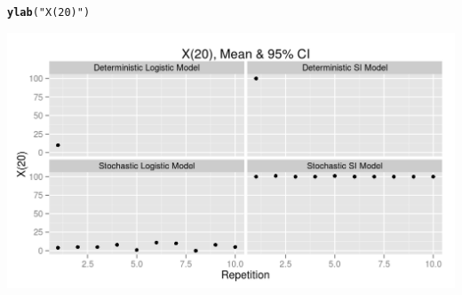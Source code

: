 \documentclass{article}\usepackage[]{graphicx}\usepackage[]{color}
\makeatletter
\newcommand{\hlstr}[1]{\textcolor[rgb]{0.192,0.494,0.8}{#1}}%
\newcommand{\hlstd}[1]{\textcolor[rgb]{0.345,0.345,0.345}{#1}}%
\newcommand{\hlkwd}[1]{\textcolor[rgb]{0.737,0.353,0.396}{\textbf{#1}}}%
\newenvironment{kframe}{%
 \def\at@end@of@kframe{}%
 \ifinner\ifhmode%
  \def\at@end@of@kframe{\end{minipage}}%
  \begin{minipage}{\columnwidth}%
 \fi\fi%
 \def\FrameCommand##1{\hskip\@totalleftmargin \hskip-\fboxsep
 \colorbox{shadecolor}{##1}\hskip-\fboxsep
     \hskip-\linewidth \hskip-\@totalleftmargin \hskip\columnwidth}%
 \MakeFramed {\advance\hsize-\width
   \@totalleftmargin\z@ \linewidth\hsize
   \@setminipage}}%
 {\par\unskip\endMakeFramed%
 \at@end@of@kframe}
\newenvironment{knitrout}{}{} %
\makeatother
\begin{document}
\begin{knitrout}
\begin{kframe}
\begin{alltt}
    \hlkwd{ylab}\hlstd{(}\hlstr{"X(20)"}\hlstd{)}
\end{alltt}
\end{kframe}
\includegraphics[width=.8\linewidth]{figure/Log_SI5} 

\end{knitrout}
\end{document}
